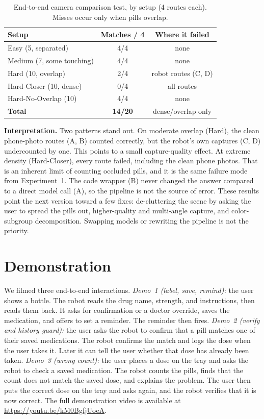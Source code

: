 \documentclass[10pt,twocolumn]{article}
\begin{document}
\begin{table}[t]
\centering
\caption{End-to-end camera comparison test, by setup (4 routes each). Misses occur
only when pills overlap.}
\label{tab:e2e}
\small
\begin{tabular}{@{}lcc@{}}
\toprule
Setup & Matches / 4 & Where it failed\\
\midrule
Easy (5, separated)        & 4/4 & none\\
Medium (7, some touching)  & 4/4 & none\\
Hard (10, overlap)         & 2/4 & robot routes (C, D)\\
Hard-Closer (10, dense)    & 0/4 & all routes\\
Hard-No-Overlap (10)       & 4/4 & none\\
\midrule
\textbf{Total}             & \textbf{14/20} & dense/overlap only\\
\bottomrule
\end{tabular}
\end{table}

\textbf{Interpretation.} Two patterns stand out. On moderate overlap (Hard), the
clean phone-photo routes (A, B) counted correctly, but the robot's own captures
(C, D) undercounted by one. This points to a small capture-quality effect. At
extreme density (Hard-Closer), every route failed, including the clean phone photos.
That is an inherent limit of counting occluded pills, and it is the same failure
mode from Experiment~1. The code wrapper (B) never changed the answer compared to a
direct model call (A), so the pipeline is not the source of error. These results
point the next version toward a few fixes: de-cluttering the scene by asking the user
to spread the pills out, higher-quality and multi-angle capture, and color-subgroup
decomposition. Swapping models or rewriting the pipeline is not the priority.

\section{Demonstration}\label{sec:demo}
We filmed three end-to-end interactions.
\emph{Demo~1 (label, save, remind):} the user shows a bottle. The robot reads the
drug name, strength, and instructions, then reads them back. It asks for
confirmation or a doctor override, saves the medication, and offers to set a
reminder. The reminder then fires.
\emph{Demo~2 (verify and history guard):} the user asks the robot to confirm that a
pill matches one of their saved medications. The robot confirms the match and logs
the dose when the user takes it. Later it can tell the user whether that dose has
already been taken.
\emph{Demo~3 (wrong count):} the user places a dose on the tray and asks the robot to
check a saved medication. The robot counts the pills, finds that the count does not
match the saved dose, and explains the problem. The user then puts the correct dose
on the tray and asks again, and the robot verifies that it is now correct. The full
demonstration video is available at \url{https://youtu.be/kM0BgfjUoeA}.
\end{document}
